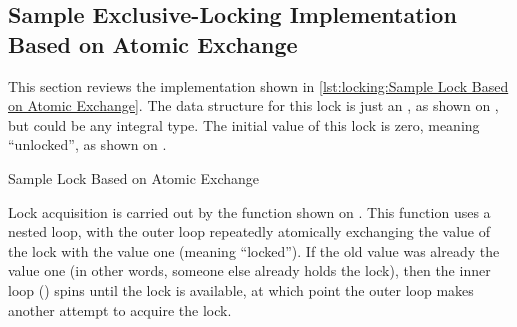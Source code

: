 \subsection{Sample Exclusive-Locking Implementation Based on Atomic Exchange}
\label{sec:locking:Sample Exclusive-Locking Implementation Based on Atomic Exchange}

\begin{fcvref}
This section reviews the implementation shown in
\cref{lst:locking:Sample Lock Based on Atomic Exchange}.
The data structure for this lock is just an , as shown on
, but could be any integral type.
The initial value of this lock is zero, meaning ``unlocked'',
as shown on .
\end{fcvref}

\begin{listing}

\caption{Sample Lock Based on Atomic Exchange}
\label{lst:locking:Sample Lock Based on Atomic Exchange}
\end{listing}

\QuickQuizEnd

\begin{fcvref}
Lock acquisition is carried out by the  function
shown on .
This function uses a nested loop, with the outer loop repeatedly
atomically exchanging the value of the lock with the value one
(meaning ``locked'').
If the old value was already the value one (in other words, someone
else already holds the lock), then the inner loop ()
spins until the lock is available, at which point the outer loop
makes another attempt to acquire the lock.
\end{fcvref}

